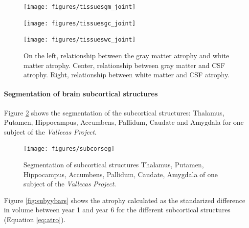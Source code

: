 \documentclass[11pt]{article}
\theoremstyle{definition}
\theoremstyle{remark}
\begin{document}
\begin{figure}[!htb]
    \centering
    \begin{minipage}{.33\textwidth}
        \centering
        \texttt{[image: figures/tissuesgm\_joint]} %
    \end{minipage}%
    \hfill
    \begin{minipage}{0.33\textwidth}
        \centering
        \texttt{[image: figures/tissuesgc\_joint]}
    \end{minipage}
    \hfill
    \begin{minipage}{0.33\textwidth}
        \centering
        \texttt{[image: figures/tissueswc\_joint]}
    \end{minipage}
    \caption{On the left, relationship between the gray matter atrophy and white matter atrophy. Center, relationship between gray matter and CSF atrophy. Right, relationship between white matter and CSF atrophy.}
    \label{fig:jointtissues}
\end{figure}


\paragraph*{Segmentation of brain subcortical structures}

Figure \ref{fig:subcorseg} shows the segmentation of the subcortical structures: Thalamus, Putamen, Hippocampus, Accumbens, Pallidum, Caudate and Amygdala for one subject of the \emph{Vallecas Project}. 

\begin{figure}[!htb]
        \centering
        \texttt{[image: figures/subcorseg]}
        \caption{Segmentation of subcortical structures Thalamus, Putamen, Hippocampus, Accumbens, Pallidum, Caudate, Amygdala of one subject of the \emph{Vallecas Project}. } 
        \label{fig:subcorseg}
\end{figure}

Figure \ref{fig:subyybars} shows the atrophy calculated as the standarized difference in volume between year 1 and year 6 for the different subcortical structures (Equation \ref{eq:atro}).
\end{document}
